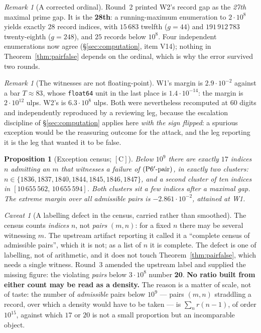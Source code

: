 \documentclass[11pt,a4paper]{article}
\theoremstyle{plain}
\newtheorem{proposition}[theorem]{Proposition}
\theoremstyle{definition}
\theoremstyle{remark}
\newtheorem{remark}[theorem]{Remark}
\newtheorem{hazard}[theorem]{Caveat}
\newcommand{\cC}{{[\mathrm{C}]}}
\newcommand{\Ppair}{\textup{(P6$'$-pair)}}
\begin{document}
\begin{remark}[A corrected ordinal]
Round~2 printed W2's record gap as the \emph{27th} maximal prime gap. It is the \textbf{28th}:
a running-maximum enumeration to $2\cdot10^8$ yields exactly $28$ record indices, with
$15\,683$ twelfth ($g = 44$) and $191\,912\,783$ twenty-eighth ($g = 248$), and $25$ records
below $10^8$. Four independent enumerations now agree
(\S\ref{sec:computation}, item V14); nothing in Theorem~\ref{thm:pairfalse} depends on the
ordinal, which is why the error survived two rounds.
\end{remark}

\begin{remark}[The witnesses are not floating-point]
W1's margin is $2.9\cdot10^{-2}$ against a bar $T \approx 83$, whose \texttt{float64} unit in
the last place is $1.4\cdot10^{-14}$: the margin is $2\cdot10^{12}$ ulps. W2's is
$6.3\cdot10^{8}$ ulps. Both were nevertheless recomputed at 60 digits and independently
reproduced by a reviewing leg, because the escalation discipline of
\S\ref{sec:computation} applies here \emph{with the sign flipped}: a spurious exception would
be the reassuring outcome for the attack, and the leg reporting it is the leg that wanted it
to be false.
\end{remark}

\begin{proposition}[Exception census; $\cC$]
\label{prop:census}
Below $10^9$ there are exactly $17$ indices $n$ admitting an $m$ that witnesses a failure of
$\Ppair$, in exactly two clusters: $n \in \{1836, 1837, 1840, 1844, 1845, 1846, 1847\}$, and a
second cluster of ten indices in $[10\,655\,562,\, 10\,655\,594]$. Both clusters sit a few
indices \emph{after} a maximal gap. The extreme margin over all admissible pairs is
$-2.861\cdot10^{-2}$, attained at W1.
\end{proposition}

\begin{hazard}[A labelling defect in the census, carried rather than smoothed]
\label{haz:census}
The census counts \emph{indices} $n$, not \emph{pairs} $(m,n)$: for a fixed $n$ there may be
several witnessing $m$. The upstream artifact reporting it called it a ``complete census of
admissible pairs'', which it is not; as a list of $n$ it is complete. The defect is one of
labelling, not of arithmetic, and it does not touch Theorem~\ref{thm:pairfalse}, which needs a
single witness. Round~3 amended the upstream label and supplied the missing figure: the
violating \emph{pairs} below $3\cdot10^8$ number \textbf{20}. \textbf{No ratio built from
either count may be read as a density.} The reason is a matter of scale, not of taste: the
number of \emph{admissible} pairs below $10^9$ --- pairs $(m,n)$ straddling a record, over
which a density would have to be taken --- is $\sum_n r(n-1)$, of order $10^{15}$, against
which $17$ or $20$ is not a small proportion but an incomparable object.
\end{hazard}
\end{document}
